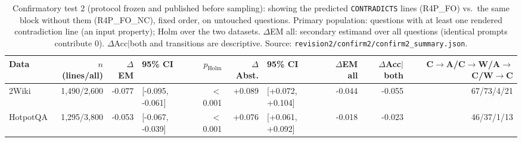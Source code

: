\begin{table}[t]
\centering
\footnotesize
\begin{adjustbox}{max width=\linewidth}
\begin{tabular}{@{}lrrlrrlrrr@{}}
\toprule
Data & $n$ (lines/all) & $\Delta$EM & 95\% CI & $p_{\text{Holm}}$ & $\Delta$Abst. & 95\% CI & $\Delta$EM all & $\Delta$Acc$\mid$both & C$\to$A/C$\to$W/A$\to$C/W$\to$C \\
\midrule
2Wiki & 1,490/2,600 & -0.077 & [-0.095, -0.061] & $<$0.001 & +0.089 & [+0.072, +0.104] & -0.044 & -0.055 & 67/73/4/21 \\
HotpotQA & 1,295/3,800 & -0.053 & [-0.067, -0.039] & $<$0.001 & +0.076 & [+0.061, +0.092] & -0.018 & -0.023 & 46/37/1/13 \\
\bottomrule
\end{tabular}
\end{adjustbox}
\caption{Confirmatory test 2 (protocol frozen and published before sampling): showing the predicted \texttt{CONTRADICTS} lines (R4P\_FO) vs.\ the same block without them (R4P\_FO\_NC), fixed order, on untouched questions. Primary population: questions with at least one rendered contradiction line (an input property); Holm over the two datasets. $\Delta$EM all: secondary estimand over all questions (identical prompts contribute 0). $\Delta$Acc$\mid$both and transitions are descriptive. Source: \texttt{revision2/\allowbreak confirm2/\allowbreak confirm2\_summary.json}.}
\label{tab:confirm2}
\end{table}
